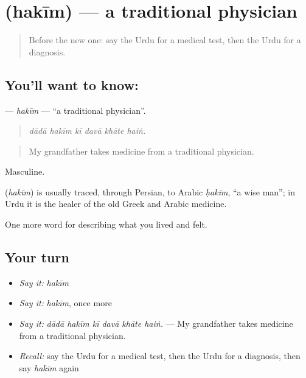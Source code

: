 \section[\texorpdfstring{\ur{حکیم} (hakīm)}{حکیم (hakīm)}]{ (hakīm) — a traditional physician}

\label{lesson:UR-C476-hakim}



\begin{quote}
Before the new one: say the Urdu for a medical test, then the Urdu for a diagnosis.
\end{quote}

\subsection*{You'll want to know: }
\textbf{} — \emph{hakīm} — \textquotedblleft{}a traditional physician\textquotedblright{}.

\begin{quote}
     
\end{quote}

\begin{quote}
\emph{dādā hakīm kī davā khāte haiṅ.}
\end{quote}

\begin{quote}
My grandfather takes medicine from a traditional physician.
\end{quote}

Masculine.

\begin{cousinweb}
\textbf{} (\emph{hakīm}) is usually traced, through Persian, to Arabic \emph{ḥakīm}, \textquotedblleft{}a wise man\textquotedblright{}; in Urdu it is the healer of the old Greek and Arabic medicine.
\end{cousinweb}

\begin{grammarlens}[title={What you've built}]
One more word for describing what you lived and felt.
\end{grammarlens}

\subsection*{Your turn}
\begin{itemize}
\raggedright
  \item \emph{Say it:} \emph{hakīm}
  \item \emph{Say it:} \emph{hakīm}, once more
  \item \emph{Say it:} \emph{dādā hakīm kī davā khāte haiṅ.} — My grandfather takes medicine from a traditional physician.
  \item \emph{Recall:} say the Urdu for a medical test, then the Urdu for a diagnosis, then say \emph{hakīm} again
\end{itemize}

